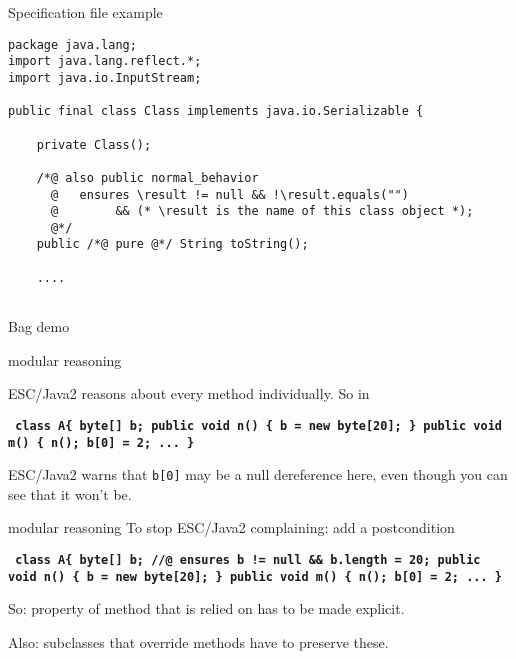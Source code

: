 \documentclass[
pdf,
nocolorBG,
slideColor,
cok,
]{prosper}
\newcommand{\code}[1]{{\rm \texttt{\textbf{\scriptsize #1}}}}
\newcommand{\bsl}{\char'134}
\newcommand{\result}{\bsl result}
\begin{document}
\begin{slide}{Specification file example}
\vspace*{-6ex}
\tiny
\begin{verbatim}
package java.lang;
import java.lang.reflect.*;
import java.io.InputStream;

public final class Class implements java.io.Serializable {

    private Class();

    /*@ also public normal_behavior
      @   ensures \result != null && !\result.equals("")
      @        && (* \result is the name of this class object *);
      @*/
    public /*@ pure @*/ String toString();

    ....


\end{verbatim}
\end{slide}


\begin{slide}{Bag demo}

\end{slide}

\begin{slide}{modular reasoning}
\vspace*{-6ex}

ESC/Java2 reasons about every method individually.
So in

\begin{alltt}\code{ class A\{
  byte[] b;
  public void n() \{ b = new byte[20]; \}
  public void m() \{ n();
                    b[0] = 2;
                    ...       \}
}
\end{alltt} %

ESC/Java2 warns that \texttt{b[0]} may be a null dereference here,
even though you can see that it won't be.
\end{slide}

\begin{slide}{modular reasoning}
\vspace*{-6ex}
To stop ESC/Java2 complaining: add a postcondition
\begin{alltt}\code{ class A\{
  byte[] b;
 {\green //@ ensures b != null && b.length = 20;}
  public void n() \{ b = new byte[20]; \}
  public void m() \{ n();
                    b[0] = 2;
                    ...       \} 
}
\end{alltt} %
So: property of method that is relied on has to be made explicit.

Also: subclasses that override methods have to preserve these.

\end{slide}
\end{document}
